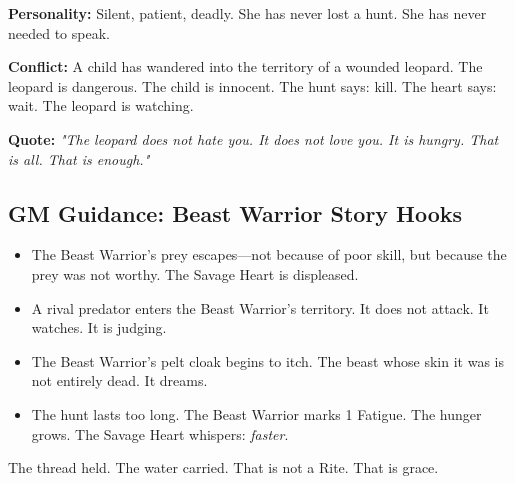 \textbf{Personality:} Silent, patient, deadly. She has never lost a hunt. She has never needed to speak.

\textbf{Conflict:} A child has wandered into the territory of a wounded leopard. The leopard is dangerous. The child is innocent. The hunt says: kill. The heart says: wait. The leopard is watching.

\textbf{Quote:} \textit{"The leopard does not hate you. It does not love you. It is hungry. That is all. That is enough."}

\subsection{GM Guidance: Beast Warrior Story Hooks}

\begin{itemize}
\item The Beast Warrior's prey escapes—not because of poor skill, but because the prey was not worthy. The Savage Heart is displeased.
\item A rival predator enters the Beast Warrior's territory. It does not attack. It watches. It is judging.
\item The Beast Warrior's pelt cloak begins to itch. The beast whose skin it was is not entirely dead. It dreams.
\item The hunt lasts too long. The Beast Warrior marks 1 Fatigue. The hunger grows. The Savage Heart whispers: \textit{faster}.
\end{itemize}

The thread held. The water carried. That is not a Rite. That is grace.
